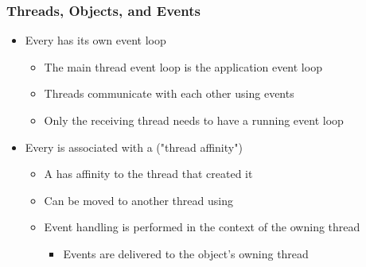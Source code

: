 
\begin{slide}
\frametitle{Threads, Objects, and Events}

\begin{itemize}
\item Every  has its own event loop
  \begin{itemize}
  \item The main thread event loop is the application event loop
  \item Threads communicate with each other using events
  \item Only the receiving thread needs to have a running event loop
  \end{itemize}
\item Every  is associated with a  ("thread affinity")
  \begin{itemize}
  \item A  has affinity to the thread that created it
  \item Can be moved to another thread using 
  \item Event handling is performed in the context of the owning thread
    \begin{itemize}
    \item Events are delivered to the object's owning thread
    \end{itemize}
  \end{itemize}
\end{itemize}

\end{slide}


